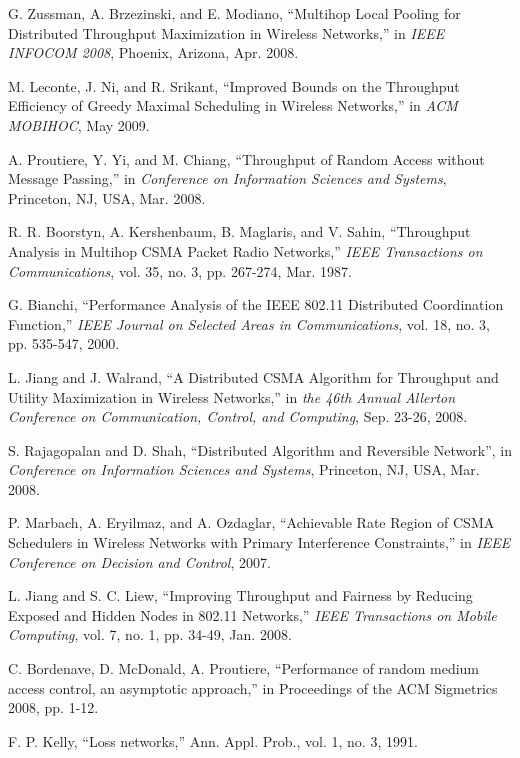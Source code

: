 \documentclass{IEEEtran}
\begin{document}
\begin{thebibliography}{32}
G. Zussman, A. Brzezinski, and E. Modiano,
{}``Multihop Local Pooling for Distributed Throughput Maximization
in Wireless Networks,'' in \emph{IEEE INFOCOM 2008}, Phoenix, Arizona,
Apr. 2008.

M. Leconte, J. Ni, and R. Srikant, {}``Improved
Bounds on the Throughput Efficiency of Greedy Maximal Scheduling in
Wireless Networks,'' in \emph{ACM MOBIHOC}, May 2009.

A. Proutiere, Y. Yi, and M. Chiang, {}``Throughput
of Random Access without Message Passing,'' in \emph{Conference on
Information Sciences and Systems}, Princeton, NJ, USA, Mar. 2008.

R. R. Boorstyn, A. Kershenbaum, B. Maglaris, and
V. Sahin, {}``Throughput Analysis in Multihop CSMA Packet Radio Networks,''
\emph{IEEE Transactions on Communications}, vol. 35, no. 3, pp. 267-274,
Mar. 1987.

G. Bianchi, {}``Performance Analysis of the IEEE
802.11 Distributed Coordination Function,'' \emph{IEEE Journal on
Selected Areas in Communications}, vol. 18, no. 3, pp. 535-547, 2000.

L. Jiang and J. Walrand, {}``A Distributed CSMA
Algorithm for Throughput and Utility Maximization in Wireless Networks,''
in \emph{the 46th Annual Allerton Conference on Communication, Control,
and Computing}, Sep. 23-26, 2008.

S. Rajagopalan and D. Shah, {}``Distributed Algorithm
and Reversible Network'', in \emph{Conference on Information Sciences
and Systems}, Princeton, NJ, USA, Mar. 2008.

P. Marbach, A. Eryilmaz, and A. Ozdaglar, {}``Achievable
Rate Region of CSMA Schedulers in Wireless Networks with Primary Interference
Constraints,'' in \emph{IEEE Conference on Decision and Control},
2007.

L. Jiang and S. C. Liew, {}``Improving Throughput
and Fairness by Reducing Exposed and Hidden Nodes in 802.11 Networks,''
\emph{IEEE Transactions on Mobile Computing}, vol. 7, no. 1, pp. 34-49,
Jan. 2008.

C. Bordenave, D. McDonald, A. Proutiere, {}``Performance
of random medium access control, an asymptotic approach,'' in Proceedings
of the ACM Sigmetrics 2008, pp. 1-12.

F. P. Kelly, \textquotedblleft{}Loss networks,\textquotedblright{}
Ann. Appl. Prob., vol. 1, no. 3, 1991.


\end{thebibliography}
\end{document}
